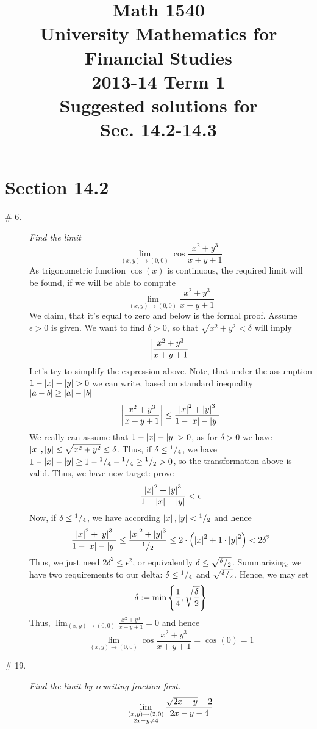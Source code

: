 \documentclass[8pt]{article} %
\title{Math 1540\\University Mathematics for Financial Studies\\2013-14 Term 1\\Suggested solutions for\\
Sec. 14.2-14.3}
\begin{document}
\maketitle
\section{Section 14.2}
\begin{description}
	\item[\# 6.]{{\it Find the limit}\[\lim_{(x,y)\to(0,0)}\cos\frac{x^2+y^3}{x+y+1}\]
		}
		As trigonometric function $\cos(x)$ is continuous, the required limit will be found, if we will be able to compute
		\[\lim_{(x,y)\to(0,0)}\frac{x^2+y^3}{x+y+1}\]
		We claim, that it's equal to zero and below is the formal proof. Assume $\epsilon>0$ is given. We want to find $
		\delta>0$, so that $\sqrt{x^2+y^2}<\delta$ will imply
		\[\left|\frac{x^2+y^3}{x+y+1}\right|\]
		Let's try to simplify the expression above. Note, that under the assumption $1-\myabs{x}-\myabs{y}>0$ we can write,
		based on standard inequality $\left|a-b\right|\geq\left|a\right|-\left|b\right|$
		\[\left|\frac{x^2+y^3}{x+y+1}\right|\leq\frac{\left|x\right|^2+\left|y\right|^3}{1-\left|x\right|-\left|y\right|}\]
		We really can assume that $1-\myabs{x}-\myabs{y}>0$, as for $\delta>0$ we have $\left|x\right|,\left|y\right|\leq\sqrt{x^2+
		y^2}\leq\delta$. Thus, if $\delta\leq{^{1}/_{4}}$, we have $1-\left|x\right|-\left|y\right|\geq 1-{^{1}/_{4}}-{^{1}/_{4}}
		\geq{^{1}/_{2}}>0$, so the transformation above is valid. Thus, we have new target: prove
		\[\frac{\left|x\right|^2+\left|y\right|^3}{1-\left|x\right|-\left|y\right|}<\epsilon\]
		Now, if $\delta\leq{^{1}/_{4}}$, we have according $\left|x\right|,\left|y\right|<{^{1}/_{2}}$ and hence
		\[\frac{\left|x\right|^2+\left|y\right|^3}{1-\left|x\right|-\left|y\right|}\leq
		\frac{\left|x\right|^2+\left|y\right|^3}{{^{1}/_{2}}}\leq2\cdot\left(\left|x\right|^2+1\cdot\left|y\right|^2\right)<2\delta^2\]
		Thus, we just need $2\delta^2\leq\epsilon^2$, or equivalently $\delta\leq\sqrt{{^{\delta}/_{2}}}$. Summarizing,
		we have two requirements to our delta: $\delta\leq{^{1}/_{4}}$ and $\sqrt{{^{\delta}/_{2}}}$. Hence, we may set
		\[\delta:=\min\mycbra{\frac{1}{4},\sqrt{\frac{\delta}{2}}}\]
		Thus, $\lim_{(x,y)\to(0,0)}\frac{x^2+y^3}{x+y+1}=0$ and hence
		\[\lim_{(x,y)\to(0,0)}\cos\frac{x^2+y^3}{x+y+1}=\cos(0)=1\]
	\item[\# 19.]{{\it Find the limit by rewriting fraction first.}
		\[\lim_{\begin{subarray}{c}(x,y)\to(2,0)\\2x-y\neq4\end{subarray}}\frac{\sqrt{2x-y}-2}{2x-y-4}\]
}
\end{description}
\end{document}
